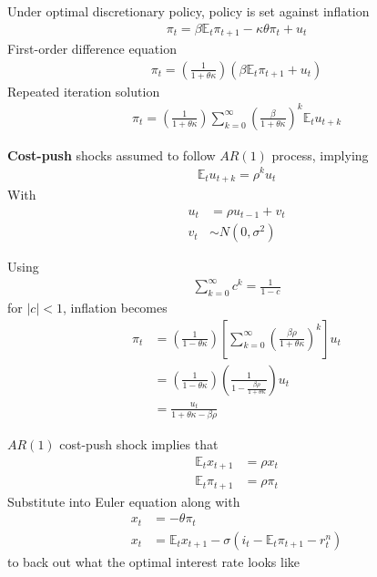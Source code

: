 \documentclass{beamer}
\begin{document}
\begin{frame}
 Under optimal discretionary policy, policy is set against inflation
\begin{align}
  \pi_t=\beta \mathbb{E}_t\pi_{t+1}-\kappa\theta\pi_t+u_t
\end{align}
\medskip
First-order difference equation
\begin{align}
  \pi_t=\left(\frac{1}{1+\theta\kappa}\right) (\beta \mathbb{E}_t\pi_{t+1} + u_t)
\end{align}
\medskip
Repeated iteration solution
\begin{align}
  \pi_t = \left(\frac{1}{1+\theta\kappa}\right) \sum_{k=0}^{\infty} \left(\frac{\beta}{1+\theta\kappa}\right)^k \mathbb{E}_tu_{t+k}
\end{align}
\end{frame}

\begin{frame}
  \textbf{Cost-push} shocks assumed to follow $AR(1)$ process, implying
  \begin{align}
    \mathbb{E}_tu_{t+k}=\rho^ku_t
  \end{align}
  \medskip
  With 
  \begin{align}
 u_t&=\rho u_{t-1} + v_t \\ \nonumber v_t &\sim N(0,\sigma^2) 
\end{align}
\end{frame}

\begin{frame}
  Using
  \begin{align}
    \sum_{k=0}^{\infty}c^k=\frac{1}{1-c}
  \end{align}
for $|c|<1$, inflation becomes
\begin{align}
  \pi_t &= \left( \frac{1}{1-\theta\kappa} \right) \left[ \sum_{k=0}^{\infty} \left( \frac{\beta\rho}{1+\theta\kappa} \right)^k \right]u_t\\
  &= \left( \frac{1}{1-\theta\kappa} \right) \left( \frac{1}{1-\frac{\beta\rho}{1+\theta\kappa}} \right) u_t\\
  &= \frac{u_t}{1+\theta\kappa-\beta\rho}
\end{align}
\end{frame}
\begin{frame}
  $AR(1)$ cost-push shock implies that 
\begin{align}
  \mathbb{E}_tx_{t+1} &= \rho x_t\\
  \mathbb{E}_t \pi_{t+1} &= \rho \pi_t  
\end{align}
\medskip
Substitute into Euler equation along with
\begin{align}
  x_t&=-\theta\pi_t\\ \nonumber
  x_t&=\mathbb{E}_t x_{t+1}-\sigma(i_t-\mathbb{E}_t \pi_{t+1}-r_t^n)
\end{align}
\medskip
to back out what the optimal interest rate looks like  
\end{frame}
\end{document}
